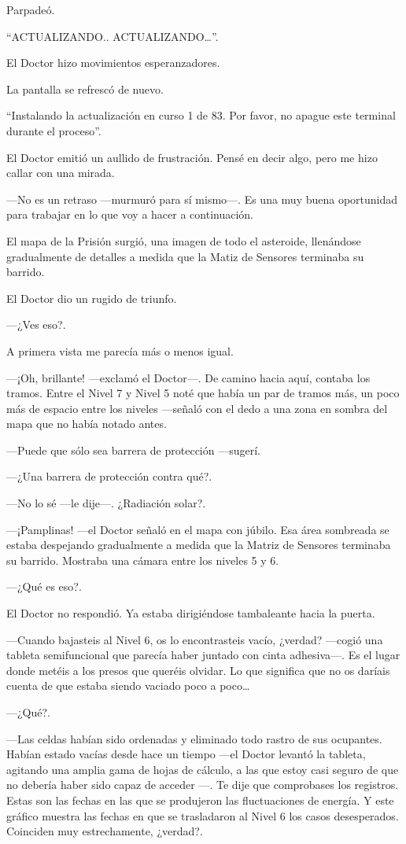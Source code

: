 Parpadeó.

``ACTUALIZANDO.. ACTUALIZANDO\ldots{}''.

El Doctor hizo movimientos esperanzadores.

La pantalla se refrescó de nuevo.

``Instalando la actualización en curso 1 de 83. Por favor, no apague
este terminal durante el proceso''.

El Doctor emitió un aullido de frustración. Pensé en decir algo, pero me
hizo callar con una mirada.

---No es un retraso ---murmuró para sí mismo---. Es una muy buena
oportunidad para trabajar en lo que voy a hacer a continuación.

El mapa de la Prisión surgió, una imagen de todo el asteroide,
llenándose gradualmente de detalles a medida que la Matiz de Sensores
terminaba su barrido.

El Doctor dio un rugido de triunfo.

---¿Ves eso?.

A primera vista me parecía más o menos igual.

---¡Oh, brillante! ---exclamó el Doctor---. De camino hacia aquí,
contaba los tramos. Entre el Nivel 7 y Nivel 5 noté que había un par de
tramos más, un poco más de espacio entre los niveles ---señaló con el
dedo a una zona en sombra del mapa que no había notado antes.

---Puede que sólo sea barrera de protección ---sugerí.

---¿Una barrera de protección contra qué?.

---No lo sé ---le dije---. ¿Radiación solar?.

---¡Pamplinas! ---el Doctor señaló en el mapa con júbilo. Esa área
sombreada se estaba despejando gradualmente a medida que la Matriz de
Sensores terminaba su barrido. Mostraba una cámara entre los niveles 5 y
6.

---¿Qué es eso?.

El Doctor no respondió. Ya estaba dirigiéndose tambaleante hacia la
puerta.

---Cuando bajasteis al Nivel 6, os lo encontrasteis vacío, ¿verdad?
---cogió una tableta semifuncional que parecía haber juntado con cinta
adhesiva---. Es el lugar donde metéis a los presos que queréis olvidar.
Lo que significa que no os daríais cuenta de que estaba siendo vaciado
poco a poco\ldots{}

---¿Qué?.

---Las celdas habían sido ordenadas y eliminado todo rastro de sus
ocupantes. Habían estado vacías desde hace un tiempo ---el Doctor
levantó la tableta, agitando una amplia gama de hojas de cálculo, a las
que estoy casi seguro de que no debería haber sido capaz de acceder ---.
Te dije que comprobases los registros. Estas son las fechas en las que
se produjeron las fluctuaciones de energía. Y este gráfico muestra las
fechas en que se trasladaron al Nivel 6 los casos desesperados.
Coinciden muy estrechamente, ¿verdad?.

